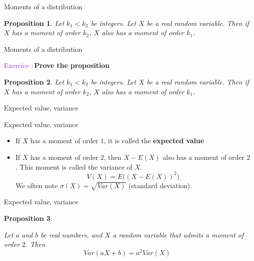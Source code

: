 \documentclass[usenames,dvipsnames]{beamer}
\newtheorem*{proposition}{Proposition}
\newcounter{numexos}%
\newcommand{\exercice}[1]{%
\addtocounter{numexos}{1}%
\textcolor{DarkOrchid}{Exercice\,\thenumexos\,:}\,#1%
}
\begin{document}
\begin{frame}{Moments of a distribution}
\begin{proposition}

    Let $k_1<k_2$ be integers. Let $X$ be a real random variable. Then if $X$ has a moment of order $k_2$, $X$ also has a moment of order $k_1$.
    
\end{proposition}
\end{frame}


\begin{frame}{Moments of a distribution}
    \exercice{\textbf{Prove the proposition}}
\begin{proposition}

    Let $k_1<k_2$ be integers. Let $X$ be a real random variable. Then if $X$ has a moment of order $k_2$, $X$ also has a moment of order $k_1$.
    
\end{proposition}
\end{frame}


\begin{frame}{Expected value, variance}

\begin{definition}{Expected value, variance}

    \begin{itemize}
        \item If $X$ has a moment of order $1$, it is called the \textbf{{expected value}} 
	\item If $X$ has a moment of order $2$, then $X-E(X)$ also has a moment of order $2$. This moment is called the variance of $X$.
	    \begin{equation*}
		V(X)=E\big((X-E(X))^2\big)
	    \end{equation*}
	    We often note $\sigma(X)= \sqrt{Var(X)}$ (standard deviation).
    \end{itemize}
\end{definition}

\end{frame}

\begin{frame}{Expected value, variance}
\begin{proposition}
    \label{prop:var}

    Let $a$ and $b$ be real numbers, and $X$ a random variable that admits a moment of order $2$. Then
    \begin{equation*}
	Var(aX+b)=a^2Var(X)
    \end{equation*}
\end{proposition}
\end{frame}
\end{document}

